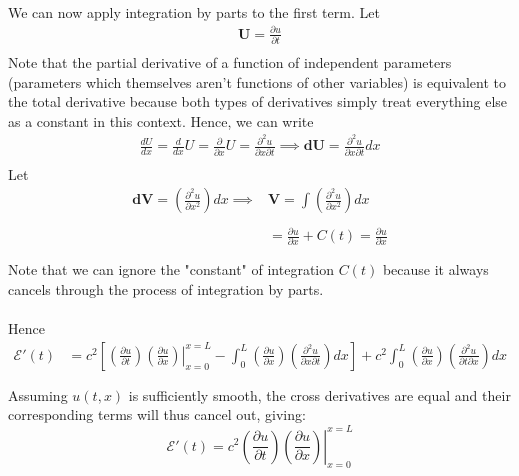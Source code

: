 \documentclass[12pt]{article}
\newcommand{\mcE}{\mathcal{E}}
\begin{document}
\begin{enumerate}[(a)]
{\begin{align*}
\end{align*}
We can now apply integration by parts to the first term. Let \\
\begin{align*}
\mathbf{U} = \frac{\partial u}{\partial t} \\
\end{align*}
Note that the partial derivative of a function of independent parameters (parameters which themselves aren't functions of other variables) is equivalent to the total derivative because both types of derivatives simply treat everything else as a constant in this context. Hence, we can write
\begin{align*}
\frac{dU}{dx} = \frac{d}{dx} U= \frac{\partial }{\partial x} U = \frac{\partial^2 u}{\partial x \partial t} \implies \mathbf{dU} = \frac{\partial^2 u}{\partial x \partial t} dx   \\ 
\end{align*}
Let 
\begin{align*}
\mathbf{dV} = \left( \frac{\partial^2 u}{\partial x^2} \right)  dx \implies& \mathbf{V} = \int \left( \frac{\partial^2 u}{\partial x^2} \right)  dx \\ \\
&=  \frac{\partial u}{\partial x} + C(t)  = \frac{\partial u}{\partial x} \\ \\
\end{align*}
Note that we can ignore the "constant" of integration $C(t)$ because it always cancels through the process of integration by parts. \\ \\
Hence
\begin{align*}
\mcE'(t) &= c^2 \left[ \left. \left( \frac{\partial u}{\partial t} \right) \left( \frac{\partial u}{\partial x} \right) \right|_{x=0}^{x=L} - \int_{0}^{L} \left( \frac{\partial u}{\partial x} \right) \left( \frac{\partial^2 u}{\partial x \partial t} \right) dx \right] + c^2 \int_0^L\left( \frac{\partial u}{\partial x}\right) \left( \frac{\partial^2 u}{\partial t \partial x} \right)  dx \\\\
\end{align*}
Assuming $u(t,x)$ is sufficiently smooth, the cross derivatives are equal and their corresponding terms will thus cancel out, giving:
$$\mcE'(t) = c^2 \left. \left( \frac{\partial u}{\partial t} \right) \left( \frac{\partial u}{\partial x} \right) \right|_{x=0}^{x=L}$$
}

\vspace{0.01in}


\end{enumerate}
\end{document}

